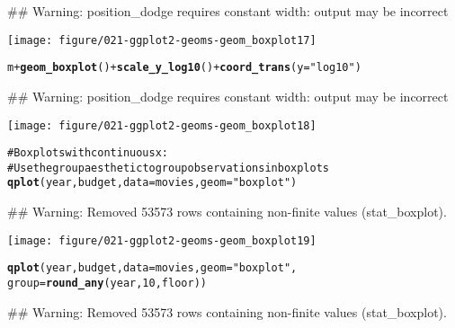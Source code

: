 \documentclass[a4paper,titlepage]{tufte-handout}\usepackage{graphicx, color}
\makeatletter
\def\maxwidth{ %
  \ifdim\Gin@nat@width>\linewidth
    \linewidth
  \else
    \Gin@nat@width
  \fi
}
\newcommand{\hlfunctioncall}[1]{\textcolor[rgb]{0.501960784313725,0,0.329411764705882}{\textbf{#1}}}%
\newcommand{\hlstring}[1]{\textcolor[rgb]{0.6,0.6,1}{#1}}%
\newcommand{\hlcomment}[1]{\textcolor[rgb]{0.180392156862745,0.6,0.341176470588235}{#1}}%
\newenvironment{kframe}{%
 \def\at@end@of@kframe{}%
 \ifinner\ifhmode%
  \def\at@end@of@kframe{\end{minipage}}%
  \begin{minipage}{\columnwidth}%
 \fi\fi%
 \def\FrameCommand##1{\hskip\@totalleftmargin \hskip-\fboxsep
 \colorbox{shadecolor}{##1}\hskip-\fboxsep
     \hskip-\linewidth \hskip-\@totalleftmargin \hskip\columnwidth}%
 \MakeFramed {\advance\hsize-\width
   \@totalleftmargin\z@ \linewidth\hsize
   \@setminipage}}%
 {\par\unskip\endMakeFramed%
 \at@end@of@kframe}
\newenvironment{knitrout}{}{} %
\makeatother
\begin{document}
\begin{knitrout}
\begin{kframe}
{\ttfamily\noindent\textcolor{warningcolor}{\#\# Warning: position\_dodge requires constant width: output may be incorrect}}\end{kframe}\texttt{[image: figure/021-ggplot2-geoms-geom\_boxplot17]} \begin{kframe}\begin{alltt}
m + \hlfunctioncall{geom_boxplot}() + \hlfunctioncall{scale_y_log10}() + \hlfunctioncall{coord_trans}(y = \hlstring{"log10"})
\end{alltt}


{\ttfamily\noindent\textcolor{warningcolor}{\#\# Warning: position\_dodge requires constant width: output may be incorrect}}\end{kframe}\texttt{[image: figure/021-ggplot2-geoms-geom\_boxplot18]} \begin{kframe}\begin{alltt}
\hlcomment{# Boxplots with continuous x:}
\hlcomment{# Use the group aesthetic to group observations in boxplots}
\hlfunctioncall{qplot}(year, budget, data = movies, geom = \hlstring{"boxplot"})
\end{alltt}


{\ttfamily\noindent\textcolor{warningcolor}{\#\# Warning: Removed 53573 rows containing non-finite values (stat\_boxplot).}}\end{kframe}\texttt{[image: figure/021-ggplot2-geoms-geom\_boxplot19]} \begin{kframe}\begin{alltt}
\hlfunctioncall{qplot}(year, budget, data = movies, geom = \hlstring{"boxplot"},
  group = \hlfunctioncall{round_any}(year, 10, floor))
\end{alltt}


{\ttfamily\noindent\textcolor{warningcolor}{\#\# Warning: Removed 53573 rows containing non-finite values (stat\_boxplot).}}


\end{kframe}
\end{knitrout}
\end{document}
